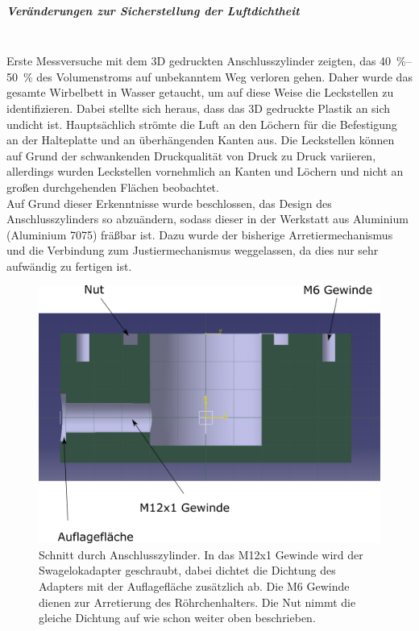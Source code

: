 \subparagraph{Veränderungen zur Sicherstellung der Luftdichtheit}
\hfill \\

Erste Messversuche mit dem 3D gedruckten Anschlusszylinder zeigten, das \SIrange{40}{50}{\%} des Volumenstroms auf unbekanntem Weg verloren gehen. Daher wurde das gesamte Wirbelbett in Wasser getaucht, um auf diese Weise die Leckstellen zu identifizieren. Dabei stellte sich heraus, dass das 3D gedruckte Plastik an sich undicht ist. Hauptsächlich strömte die Luft an den Löchern für die Befestigung an der Halteplatte und an überhängenden Kanten aus. Die Leckstellen können auf Grund der schwankenden Druckqualität von Druck zu Druck variieren, allerdings wurden Leckstellen vornehmlich an Kanten und Löchern und nicht an großen durchgehenden Flächen beobachtet. \\
Auf Grund dieser Erkenntnisse wurde beschlossen, das Design des Anschlusszylinders so abzuändern, sodass dieser in der Werkstatt aus Aluminium (Aluminium 7075) fräßbar ist. Dazu wurde der bisherige Arretiermechanismus und die Verbindung zum Justiermechanismus weggelassen, da dies nur sehr aufwändig zu fertigen ist.


\begin{figure}[h!]
	\begin{center}
		\includegraphics[scale=0.5]{Schnitt_AnschlusszylinderV2.png}
		\caption[Schnitt Zylinder V2]{Schnitt durch Anschlusszylinder. In das M12x1 Gewinde wird der Swagelokadapter geschraubt, dabei dichtet die Dichtung des Adapters mit der Auflagefläche zusätzlich ab. Die M6 Gewinde dienen zur Arretierung des Röhrchenhalters. Die Nut nimmt die gleiche Dichtung auf wie schon weiter oben beschrieben.}
	\end{center}
\end{figure}

